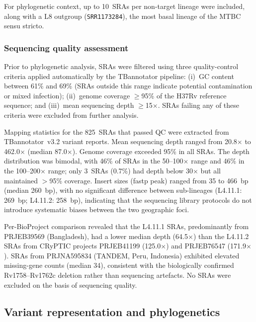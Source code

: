 \documentclass[11pt,a4paper]{article}
\newcommand{\spdi}[1]{\texttt{#1}}
\newcommand{\lignee}[1]{\textsf{#1}}
\begin{document}
For phylogenetic context, up to 10~SRAs per non-target lineage were included,
along with a \lignee{L8} outgroup (\spdi{SRR1173284}), the most
basal lineage of the MTBC sensu stricto.

\subsubsection{Sequencing quality assessment}

Prior to phylogenetic analysis, SRAs were filtered using three
quality-control criteria applied automatically by the TBannotator
pipeline: (i)~GC content between 61\% and 69\% (SRAs outside this
range indicate potential contamination or mixed infection);
(ii)~genome coverage $\geq$95\% of the H37Rv reference sequence; and
(iii)~mean sequencing depth $\geq$15$\times$.
SRAs failing any of these criteria were excluded from further analysis.

Mapping statistics for the 825~SRAs that passed QC were extracted
from TBannotator~v3.2 variant reports.  Mean sequencing depth
ranged from 20.8$\times$ to 462.0$\times$ (median 87.0$\times$).
Genome coverage exceeded 95\% in all SRAs.
The depth distribution was bimodal, with 46\% of SRAs in the
50--100$\times$ range and 46\% in the 100--200$\times$ range;
only 3~SRAs (0.7\%) had depth below 30$\times$ but all maintained
$>$95\% coverage.
Insert sizes (fastp peak) ranged from 35 to 466~bp (median 260~bp),
with no significant difference between sub-lineages
(\lignee{L4.11.1}: 269~bp; \lignee{L4.11.2}: 258~bp), indicating that
the sequencing library protocols do not introduce systematic biases
between the two geographic foci.

Per-BioProject comparison revealed that the \lignee{L4.11.1} SRAs,
predominantly from PRJEB39569 (Bangladesh), had a lower median depth
(64.5$\times$) than the \lignee{L4.11.2} SRAs from CRyPTIC projects
PRJEB41199 (125.0$\times$) and PRJEB76547 (171.9$\times$).  SRAs
from PRJNA595834 (TANDEM, Peru, Indonesia)
exhibited elevated missing-gene counts (median 34), consistent with the
biologically confirmed Rv1758--Rv1762c deletion rather than sequencing
artefacts.  No SRAs were excluded on the basis of sequencing quality.

\subsection{Variant representation and phylogenetics}
\end{document}
